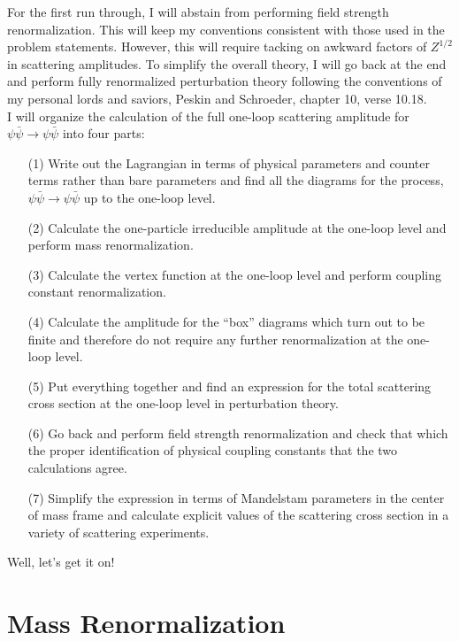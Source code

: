 \documentclass[12pt]{extarticle}
\begin{document}
For the first run through, I will abstain from performing field strength renormalization. This will keep my conventions consistent with those used in the problem statements. However, this will require tacking on awkward factors of $Z^{1/2}$ in scattering amplitudes. To simplify the overall theory, I will go back at the end and perform fully renormalized perturbation theory following the conventions of my personal lords and saviors, Peskin and Schroeder, chapter 10, verse 10.18. \bigskip \\
I will organize the calculation of the full one-loop scattering amplitude for $\psi \bar{\psi} \to \psi \bar{\psi}$ into four parts:
\begin{enumerate}
\item[(1)] Write out the Lagrangian in terms of physical parameters and counter terms rather than bare parameters and find all the diagrams for the process, $\psi \bar{\psi} \to \psi \bar{\psi}$ up to the one-loop level. 

\item[(2)] Calculate the one-particle irreducible amplitude at the one-loop level and perform mass renormalization.

\item[(3)] Calculate the vertex function at the one-loop level and perform coupling constant renormalization.

\item[(4)] Calculate the amplitude for the ``box'' diagrams which turn out to be finite and therefore do not require any further renormalization at the one-loop level. 

\item[(5)] Put everything together and find an expression for the total scattering cross section at the one-loop level in perturbation theory.

\item[(6)] Go back and perform field strength renormalization and check that which the proper identification of physical coupling constants that the two calculations agree.

\item[(7)] Simplify the expression in terms of Mandelstam parameters in the center of mass frame and calculate explicit values of the scattering cross section in a variety of scattering experiments. 
\end{enumerate} 
Well, let's get it on!

\section{Mass Renormalization}
\end{document}
